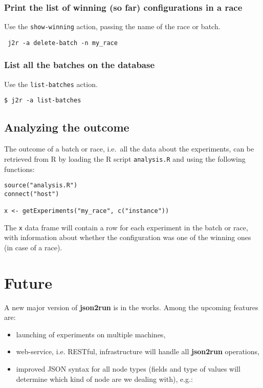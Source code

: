 \documentclass[11pt,notitlepage,twoside,a4paper]{article}
\begin{document}
\begin{footnotesize}
\begin{scriptsize}
\subsubsection{Print the list of winning (so far) configurations in a race}

Use the \texttt{show-winning} action, passing the name of the race or
batch.

\begin{lstlisting}
 j2r -a delete-batch -n my_race
\end{lstlisting}

\subsubsection{List all the batches on the database}

Use the \texttt{list-batches} action.

\begin{lstlisting}
$ j2r -a list-batches
\end{lstlisting}

\subsection{Analyzing the outcome}

The outcome of a batch or race, i.e.~all the data about the experiments,
can be retrieved from R by loading the R script \texttt{analysis.R} and
using the following functions:

\begin{lstlisting}
source("analysis.R")
connect("host") 

x <- getExperiments("my_race", c("instance"))   
\end{lstlisting}

\noindent
The \texttt{x} data frame will contain a row for each experiment in the
batch or race, with information about whether the configuration was one
of the winning ones (in case of a race).

\section{Future}

A new major version of \textbf{json2run} is in the works. Among the upcoming features are:

\begin{itemize}

    \item launching of experiments on multiple machines,
    \item web-service, i.e. RESTful, infrastructure will handle all \textbf{json2run} operations,
    \item improved JSON syntax for all node types (fields and type of values will determine which kind of node are we dealing with), e.g.:
\end{itemize}


\end{scriptsize}
\end{footnotesize}
\end{document}
